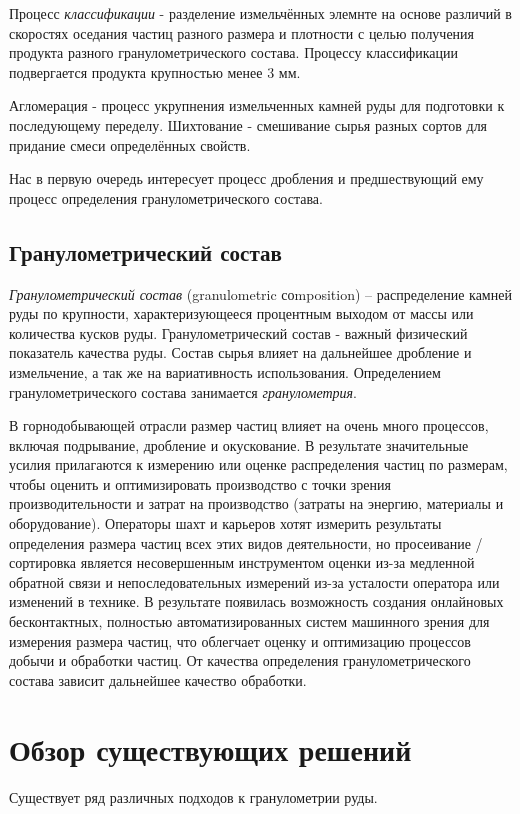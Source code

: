 \documentclass[times]{itmo-student-thesis}
\begin{document}
Процесс \textit{классификации} - разделение измельчённых элемнте на основе различий в скоростях оседания частиц разного размера и плотности с целью получения продукта разного гранулометрического состава. Процессу классификации подвергается продукта крупностью менее 3 мм.

Агломерация - процесс укрупнения измельченных камней руды для подготовки к последующему переделу. Шихтование - смешивание сырья разных сортов для придание смеси определённых свойств.

Нас в первую очередь интересует процесс дробления и предшествующий ему процесс определения гранулометрического состава.
\subsection{Гранулометрический состав}
\textit{Гранулометрический состав} (granulometric соmposition) -- распределение камней руды по крупности, характеризующееся процентным выходом от массы или количества кусков руды. 
Гранулометрический состав - важный физический показатель качества руды.  Состав сырья влияет на дальнейшее дробление и измельчение, а так же на вариативность использования. Определением гранулометрического состава занимается \textit{гранулометрия}.

В горнодобывающей отрасли размер частиц влияет на очень  много процессов, включая подрывание, дробление и окускование. В результате значительные усилия прилагаются к измерению или оценке распределения частиц по размерам, чтобы оценить и оптимизировать производство с точки зрения производительности и затрат на производство (затраты на энергию, материалы и оборудование). Операторы шахт и карьеров хотят измерить результаты определения размера частиц всех этих видов деятельности, но просеивание / сортировка является несовершенным инструментом оценки из-за медленной обратной связи и непоследовательных измерений из-за усталости оператора или изменений в технике. В результате появилась возможность создания онлайновых бесконтактных, полностью автоматизированных систем машинного зрения для измерения размера частиц, что облегчает оценку и оптимизацию процессов добычи и обработки частиц.
От качества определения гранулометрического состава зависит дальнейшее качество обработки.


\section{Обзор существующих решений}
Существует ряд различных подходов к гранулометрии руды. 
\end{document}
